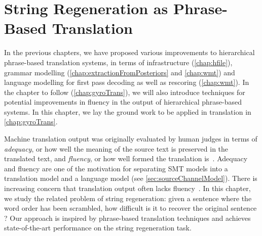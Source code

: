\chapter{String Regeneration as Phrase-Based Translation}
\label{chap:gyro}


In the previous chapters, we have proposed various improvements to hierarchical
phrase-based translation systems, in terms of
infrastructure (\autoref{chap:hfile}), grammar
modelling (\autoref{chap:extractionFromPosteriors} and \autoref{chap:wmt})
and language modelling for first pass decoding as well as
rescoring (\autoref{chap:wmt}). In the
chapter to follow (\autoref{chap:gyroTrans}), we will also
introduce techniques for potential improvements in fluency in the output
of hierarchical phrase-based systems. In this chapter, we lay
the ground work to be applied in translation in \autoref{chap:gyroTrans}.

Machine translation output was originally evaluated by
human judges in terms
of \emph{adequacy}, or how well the meaning of the source
text is preserved in the translated text, and \emph{fluency},
or how well formed the translation is~\citep{white-oconnell-carlson:1993:HLT}.
Adequacy and fluency are one of the motivation for separating SMT models
into a translation model and a language model (see \autoref{sec:sourceChannelModel}).
There is increasing concern that translation output
often lacks fluency~\citep{knight:2007:TALK}.
In this chapter, we study the related problem of
string regeneration: given a sentence where the
word order has been scrambled, how difficult is it
to recover the original sentence ? Our approach
is inspired by phrase-based translation techniques and
achieves state-of-the-art performance on the string regeneration
task.

